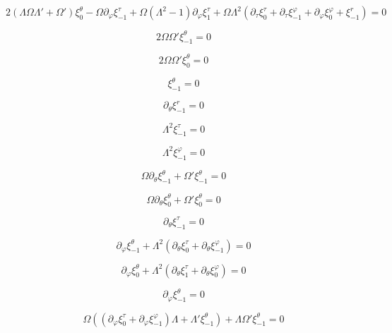 {\begin{equation}
2(\Lambda\Omega\Lambda'+\Omega')\xi^\theta_0-\Omega\partial_\varphi\xi^\tau_{-1}+\Omega(\Lambda^2-1)\partial_\varphi\xi^\tau_1+\Omega\Lambda^2(\partial_\tau\xi^\tau_0+\partial_\tau\xi^\varphi_{-1}+\partial_\varphi\xi^\varphi_0+\xi^r_{-1})=0
\end{equation}

\begin{equation}
2\Omega\Omega'\xi^\theta_{-1}=0
\end{equation}

\begin{equation}
2\Omega\Omega'\xi^\theta_{0}=0
\end{equation}

\begin{equation}
\xi^\theta_{-1}=0
\end{equation}

\begin{equation}
\partial_\theta\xi^r_{-1}=0
\end{equation}

\begin{equation}
\Lambda^2\xi^\tau_{-1}=0
\end{equation}

\begin{equation}
\Lambda^2\xi^\varphi_{-1}=0
\end{equation}

\begin{equation}
\Omega\partial_\theta\xi^\theta_{-1}+\Omega'\xi^\theta_{-1}=0
\end{equation}

\begin{equation}
\Omega\partial_\theta\xi^\theta_0+\Omega'\xi^\theta_0=0
\end{equation}

\begin{equation}
\partial_\theta\xi^\tau_{-1}=0
\end{equation}

\begin{equation}
\partial_\varphi\xi^\theta_{-1}+\Lambda^2(\partial_\theta\xi^\tau_0+\partial_\theta\xi^\varphi_{-1})=0
\end{equation}

\begin{equation}
\partial_\varphi\xi^\theta_0+\Lambda^2(\partial_\theta\xi^\tau_1+\partial_\theta\xi^\varphi_0)=0
\end{equation}

\begin{equation}
\partial_\varphi\xi^\theta_{-1}=0
\end{equation}

\begin{equation}
\Omega\left((\partial_\varphi\xi^\tau_0+\partial_\varphi\xi^\varphi_{-1})\Lambda+\Lambda'\xi^\theta_{-1}\right)+\Lambda\Omega'\xi^\theta_{-1}=0
\end{equation}
}

